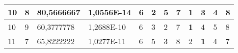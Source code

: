 \documentclass[conference]{IEEEtran}
\begin{document}
\begin{table*}[]
\begin{tabular}{|llll|llllllll|}
\multicolumn{1}{|l|}{10}                                                    & \multicolumn{1}{l|}{8}                                                        & \multicolumn{1}{l|}{80,5666667}                                                   & 1,0556E-14                     & \multicolumn{1}{l|}{6}                                                  & \multicolumn{1}{l|}{2}                                                  & \multicolumn{1}{l|}{5}                                                  & \multicolumn{1}{l|}{7}                                                  & \multicolumn{1}{l|}{\textbf{1}}                                         & \multicolumn{1}{l|}{3}                                                  & \multicolumn{1}{l|}{4}                                                  & 8                          \\ \hline
\multicolumn{1}{|l|}{10}                                                    & \multicolumn{1}{l|}{9}                                                        & \multicolumn{1}{l|}{60,3777778}                                                   & 1,2688E-10                     & \multicolumn{1}{l|}{6}                                                  & \multicolumn{1}{l|}{3}                                                  & \multicolumn{1}{l|}{2}                                                  & \multicolumn{1}{l|}{7}                                                  & \multicolumn{1}{l|}{\textbf{1}}                                         & \multicolumn{1}{l|}{4}                                                  & \multicolumn{1}{l|}{5}                                                  & 8                          \\ \hline
\multicolumn{1}{|l|}{11}                                                    & \multicolumn{1}{l|}{7}                                                        & \multicolumn{1}{l|}{65,8222222}                                                   & 1,0277E-11                     & \multicolumn{1}{l|}{6}                                                  & \multicolumn{1}{l|}{5}                                                  & \multicolumn{1}{l|}{3}                                                  & \multicolumn{1}{l|}{8}                                                  & \multicolumn{1}{l|}{2}                                                  & \multicolumn{1}{l|}{\textbf{1}}                                         & \multicolumn{1}{l|}{4}                                                  & 7                          \\ \hline

\end{tabular}
\end{table*}
\end{document}
